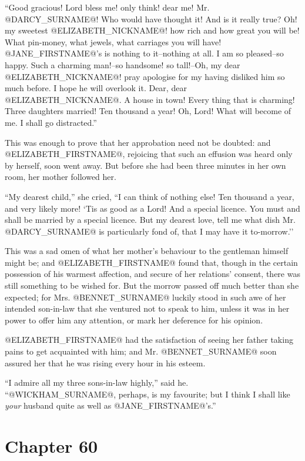 ``Good gracious! Lord bless me! only think! dear me! Mr. @DARCY_SURNAME@! Who would
have thought it! And is it really true? Oh! my sweetest @ELIZABETH_NICKNAME@! how rich
and how great you will be! What pin-money, what jewels, what carriages
you will have! @JANE_FIRSTNAME@'s is nothing to it--nothing at all. I am so
pleased--so happy. Such a charming man!--so handsome! so tall!--Oh, my
dear @ELIZABETH_NICKNAME@! pray apologise for my having disliked him so much before. I
hope he will overlook it. Dear, dear @ELIZABETH_NICKNAME@. A house in town! Every thing
that is charming! Three daughters married! Ten thousand a year! Oh,
Lord! What will become of me. I shall go distracted.''

This was enough to prove that her approbation need not be doubted: and
@ELIZABETH_FIRSTNAME@, rejoicing that such an effusion was heard only by herself,
soon went away. But before she had been three minutes in her own room,
her mother followed her.

``My dearest child,'' she cried, ``I can think of nothing else! Ten
thousand a year, and very likely more! `Tis as good as a Lord! And a
special licence. You must and shall be married by a special licence. But
my dearest love, tell me what dish Mr. @DARCY_SURNAME@ is particularly fond of,
that I may have it to-morrow.''

This was a sad omen of what her mother's behaviour to the gentleman
himself might be; and @ELIZABETH_FIRSTNAME@ found that, though in the certain
possession of his warmest affection, and secure of her relations'
consent, there was still something to be wished for. But the morrow
passed off much better than she expected; for Mrs. @BENNET_SURNAME@ luckily stood
in such awe of her intended son-in-law that she ventured not to speak to
him, unless it was in her power to offer him any attention, or mark her
deference for his opinion.

@ELIZABETH_FIRSTNAME@ had the satisfaction of seeing her father taking pains to get
acquainted with him; and Mr. @BENNET_SURNAME@ soon assured her that he was rising
every hour in his esteem.

``I admire all my three sons-in-law highly,'' said he. ``@WICKHAM_SURNAME@, perhaps,
is my favourite; but I think I shall like \textit{your} husband quite as well
as @JANE_FIRSTNAME@'s.''



\chapter*{Chapter 60}


